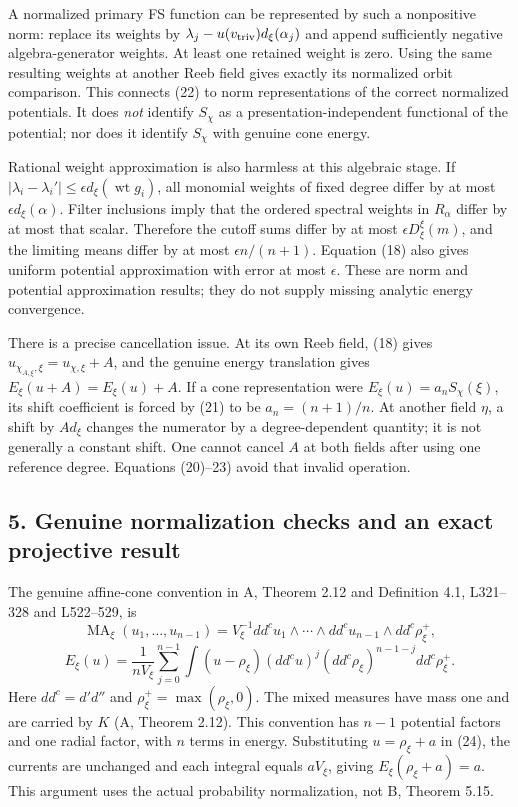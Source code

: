 \documentclass[
  11pt,
]{article}
\begin{document}
A normalized primary FS function can be represented by such a
nonpositive norm: replace its weights by
\(\lambda_j-u(v_{\rm triv})d_\xi(\alpha_j)\) and append sufficiently
negative algebra-generator weights. At least one retained weight is
zero. Using the same resulting weights at another Reeb field gives
exactly its normalized orbit comparison. This connects (22) to norm
representations of the correct normalized potentials. It does \emph{not}
identify \(S_\chi\) as a presentation-independent functional of the
potential; nor does it identify \(S_\chi\) with genuine cone energy.

Rational weight approximation is also harmless at this algebraic stage.
If \(|\lambda_i-\lambda_i'|\leq\epsilon d_\xi(\operatorname{wt}g_i)\),
all monomial weights of fixed degree differ by at most
\(\epsilon d_\xi(\alpha)\). Filter inclusions imply that the ordered
spectral weights in \(R_\alpha\) differ by at most that scalar.
Therefore the cutoff sums differ by at most \(\epsilon D_\xi^\xi(m)\),
and the limiting means differ by at most \(\epsilon n/(n+1)\). Equation
(18) also gives uniform potential approximation with error at most
\(\epsilon\). These are norm and potential approximation results; they
do not supply missing analytic energy convergence.

There is a precise cancellation issue. At its own Reeb field, (18) gives
\(u_{\chi_{A,\xi},\xi}=u_{\chi,\xi}+A\), and the genuine energy
translation gives \(E_\xi(u+A)=E_\xi(u)+A\). If a cone representation
were \(E_\xi(u)=a_nS_\chi(\xi)\), its shift coefficient is forced by
(21) to be \(a_n=(n+1)/n\). At another field \(\eta\), a shift by
\(A d_\xi\) changes the numerator by a degree-dependent quantity; it is
not generally a constant shift. One cannot cancel \(A\) at both fields
after using one reference degree. Equations (20)--23) avoid that invalid
operation.

\subsection{5. Genuine normalization checks and an exact projective
result}\label{genuine-normalization-checks-and-an-exact-projective-result}

The genuine affine-cone convention in A, Theorem 2.12 and Definition
4.1, L321--328 and L522--529, is \[
 \operatorname{MA}_\xi(u_1,\ldots,u_{n-1})=
 V_\xi^{-1}dd^c u_1\wedge\cdots\wedge dd^c u_{n-1}
                  \wedge dd^c\rho_\xi^+,
\] \[
 E_\xi(u)=\frac1{nV_\xi}\sum_{j=0}^{n-1}
 \int (u-\rho_\xi)(dd^c u)^j(dd^c\rho_\xi)^{n-1-j}
                              dd^c\rho_\xi^+.       \tag{24}
\] Here \(dd^c=d'd''\) and \(\rho_\xi^+=\max(\rho_\xi,0)\). The mixed
measures have mass one and are carried by \(K\) (A, Theorem 2.12). This
convention has \(n-1\) potential factors and one radial factor, with
\(n\) terms in energy. Substituting \(u=\rho_\xi+a\) in (24), the
currents are unchanged and each integral equals \(aV_\xi\), giving
\(E_\xi(\rho_\xi+a)=a\). This argument uses the actual probability
normalization, not B, Theorem 5.15.
\end{document}
